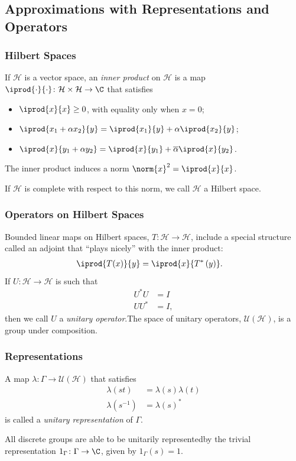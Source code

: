 \documentclass{beamer-custom}
\begin{document}
\subsection{Approximations with Representations and Operators}%
\begin{frame}
  \frametitle{Hilbert Spaces}
  If $\mathcal{H}$ is a vector space, an \textit{inner product} on $\mathcal{H}$ is a map $ \iprod{\cdot}{\cdot}\colon \mathcal{H}\times \mathcal{H}\rightarrow \C $ that satisfies\pause
  \begin{itemize}
    \item $ \iprod{x}{x} \geq 0 $, with equality only when $x = 0$;\pause
    \item $ \iprod{x_1 + \alpha x_2}{y} = \iprod{x_1}{y} + \alpha \iprod{x_2}{y} $;\pause
    \item $ \iprod{x}{y_1 + \alpha y_2} = \iprod{x}{y_1} + \overline{\alpha} \iprod{x}{y_2} $.\pause
  \end{itemize}
  The inner product induces a norm $\norm{x}^2 = \iprod{x}{x}$.\pause\newline

  If $\mathcal{H}$ is complete with respect to this norm, we call $\mathcal{H}$ a Hilbert space.
\end{frame}
\begin{frame}
  \frametitle{Operators on Hilbert Spaces}
  Bounded linear maps on Hilbert spaces, $T\colon \mathcal{H}\rightarrow \mathcal{H}$, include a special structure called an adjoint that ``plays nicely'' with the inner product:
  \begin{align*}
    \iprod{T(x)}{y} &= \iprod{x}{T^{\ast}\left( y \right)}.
  \end{align*}\pause
  If $U\colon \mathcal{H}\rightarrow \mathcal{H}$ is such that
  \begin{align*}
    U^{\ast}U &= I\\
    UU^{\ast} &= I,
  \end{align*}
  then we call $U$ a \textit{unitary operator}.\pause\:The space of unitary operators, $\mathcal{U}\left( \mathcal{H} \right)$, is a group under composition.
\end{frame}
\begin{frame}
  \frametitle{Representations}
  A map $\lambda\colon \Gamma\rightarrow \mathcal{U}\left( \mathcal{H} \right)$ that satisfies
  \begin{align*}
    \lambda\left( st \right) &= \lambda(s)\lambda(t)\\
    \lambda\left( s^{-1} \right) &= \lambda\left( s \right)^{\ast}
  \end{align*}
  is called a \textit{unitary representation} of $\Gamma$.\newline

  All discrete groups are able to be unitarily represented\pause\:by the trivial representation $1_{\Gamma}\colon \Gamma\rightarrow \C$, given by $1_{\Gamma}(s) = 1$.
\end{frame}
\end{document}
